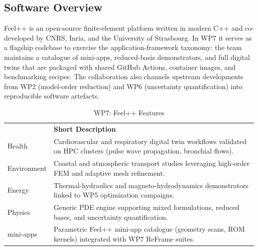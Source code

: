\subsection{Software Overview}
\label{sec:WP7:Feel++:summary}

Feel++ is an open-source finite-element platform written in modern C++ and co-developed by CNRS, Inria, and the University of
Strasbourg. In WP7 it serves as a flagship codebase to exercise the application-framework taxonomy: the team maintains a
catalogue of mini-apps, reduced-basis demonstrators, and full digital twins that are packaged with shared GitHub Actions,
container images, and benchmarking recipes. The collaboration also channels upstream developments from WP2 (model-order
reduction) and WP6 (uncertainty quantification) into reproducible software artefacts.

\begin{table}[!ht]
    \centering
    {
        \setlength{\parindent}{0pt}
        \def\arraystretch{1.25}
        {
            \fontsize{9}{11}\selectfont
            \begin{tabular}{!{\color{numpexgray}\vrule}p{.25\linewidth}!{\color{numpexgray}\vrule}p{.6885\linewidth}!{\color{numpexgray}\vrule}}

     &  {\rule{0pt}{2.5ex}\color{white}\bf Short Description }\\

    Health & Cardiovascular and respiratory digital twin workflows validated on HPC clusters (pulse wave propagation, bronchial flows). \\
    Environment & Coastal and atmospheric transport studies leveraging high-order FEM and adaptive mesh refinement. \\
    Energy & Thermal-hydraulics and magneto-hydrodynamics demonstrators linked to WP5 optimization campaigns. \\
    Physics & Generic PDE engine supporting mixed formulations, reduced bases, and uncertainty quantification. \\
    mini-apps & Parametric Feel++ mini-app catalogue (geometry scans, ROM kernels) integrated with WP7 ReFrame suites. \\
\end{tabular}
        }
    }
    \caption{WP7: Feel++ Features}
\end{table}


